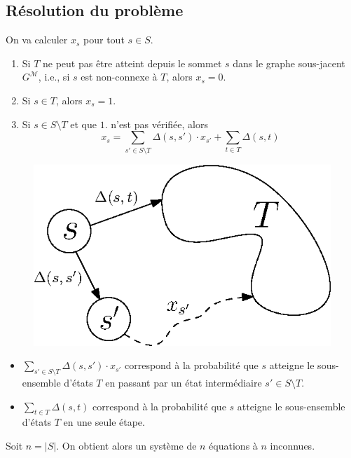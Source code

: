 \documentclass[12pt,a4paper]{report}
\theoremstyle{definition}%
\theoremstyle{remark}
\newcommand{\ie}{i.e., }
\let\labelitemi\labelitemii
\begin{document}
\subsection{Résolution du problème}
On va calculer $x_s$  pour tout $s \in S$.
\begin{enumerate}
	\item Si $T$ ne peut pas être atteint depuis le sommet $s$ dans le graphe sous-jacent $G^\mathcal{M}$, \ie si $s$ est non-connexe à $T$, alors $x_s = 0$.
	\item Si $s \in T$, alors $x_s = 1$.
	\item Si $s \in S \setminus T$ et que $1.$ n'est pas vérifiée, alors 
		\[ x_s = \sum_{s' \in S \setminus T} \Delta(s, s') \cdot x_{s'} + \sum_{t \in T} \Delta(s, t) \]
\end{enumerate}

\begin{figure}[H]
	\centering
	\includegraphics[scale=0.6]{figures/reachability.eps}
	\label{reachablity}
\end{figure}

\begin{itemize}
\renewcommand{\labelitemi}{\tiny$\bullet$}
	\item $ \sum_{s' \in S \setminus T}  \Delta(s, s') \cdot x_{s'} $ correspond à la probabilité que $s$ atteigne le sous-ensemble d'états $T$ en passant par un état intermédiaire $s' \in S \setminus T$.
	\item $\sum_{t \in T} \Delta(s, t)$ correspond à la probabilité que $s$ atteigne le sous-ensemble d'états $T$ en une seule étape.
\end{itemize}
Soit $n = |S|$. On obtient alors un système de $n$ équations à $n$ inconnues.
\end{document}
